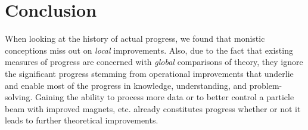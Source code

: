 
\section{Conclusion}

When looking at the history of actual progress, we found that monistic conceptions miss out on \textit{local} improvements.
Also, due to the fact that existing measures of progress are concerned with \textit{global} comparisons of theory, they ignore the significant progress stemming from operational improvements that underlie and enable most of the progress in knowledge, understanding, and problem-solving. 
Gaining the ability to process more data or to better control a particle beam with improved magnets, etc. already constitutes progress whether or not it leads to further theoretical improvements. 